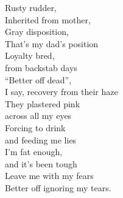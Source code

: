 Rusty rudder,\\
Inherited from mother,\\
Gray disposition,\\
That's my dad's position\\
Loyalty bred,\\
from backstab days\\
``Better off dead'',\\
I say, recovery from their haze\\
They plastered pink\\
across all my eyes\\
Forcing to drink\\
and feeding me lies\\
I'm fat enough,\\
and it's been tough\\
Leave me with my fears\\
Better off ignoring my tears.\\

